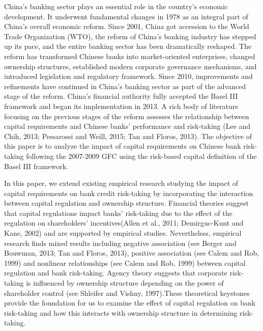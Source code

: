 \documentclass[
  12pt,
  a4paper,
]{scrreprt}
\begin{document}
China's banking sector plays an essential role in the country's economic
development. It underwent fundamental changes in 1978 as an integral
part of China's overall economic reform. Since 2001, China got accession
to the World Trade Organization (WTO), the reform of China's banking
industry has stepped up its pace, and the entire banking sector has been
dramatically reshaped. The reform has transformed Chinese banks into
market-oriented enterprises, changed ownership structures, established
modern corporate governance mechanisms, and introduced legislation and
regulatory framework. Since 2010, improvements and refinements have
continued in China's banking sector as part of the advanced stage of the
reform. China's financial authority fully accepted the Basel III
framework and began its implementation in 2013. A rich body of
literature focusing on the previous stages of the reform assesses the
relationship between capital requirements and Chinese banks' performance
and risk-taking (Lee and Chih, 2013; Pessarossi and Weill, 2015; Tan and
Floros, 2013). The objective of this paper is to analyze the impact of
capital requirements on Chinese bank risk-taking following the 2007-2009
GFC using the risk-based capital definition of the Basel III framework.

In this paper, we extend existing empirical research studying the impact
of capital requirements on bank credit risk-taking by incorporating the
interaction between capital regulation and ownership structure.
Financial theories suggest that capital regulations impact banks'
risk-taking due to the effect of the regulation on shareholders'
incentives(Allen et al., 2011; Demirguc-Kunt and Kane, 2002) and are
supported by empirical studies. Nevertheless, empirical research finds
mixed results including negative association (see Berger and Bouwman,
2013; Tan and Floros, 2013), positive association (see Calem and Rob,
1999) and nonlinear relationships (see Calem and Rob, 1999) between
capital regulation and bank risk-taking. Agency theory suggests that
corporate risk-taking is influenced by ownership structure depending on
the power of shareholder control (see Shleifer and Vishny, 1997).These
theoretical keystones provide the foundation for us to examine the
effect of capital regulation on bank risk-taking and how this interacts
with ownership structure in determining risk-taking.
\end{document}
